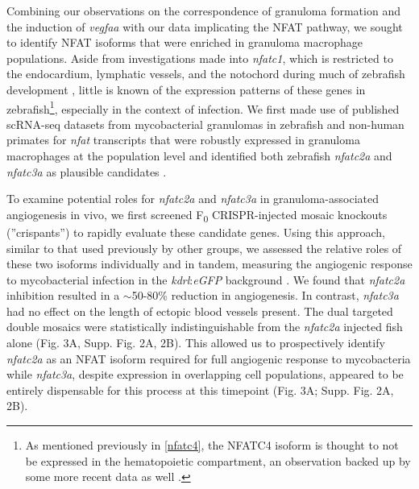 Combining our observations on the correspondence of granuloma formation and the induction of \textit{vegfaa} with our data implicating the NFAT pathway, we sought to identify NFAT isoforms that were enriched in granuloma macrophage populations. Aside from investigations made into \textit{nfatc1}, which is restricted to the endocardium, lymphatic vessels, and the notochord during much of zebrafish development \citep{Pestel2016, Shin2019, Bagwell2020}, little is known of the expression patterns of these genes in zebrafish\footnote{As mentioned previously in \autoref{nfatc4}, the NFATC4 isoform is thought to not be expressed in the hematopoietic compartment, an observation backed up by some more recent data as well \citep{Peuker2022}.}, especially in the context of infection. We first made use of published scRNA-seq datasets from mycobacterial granulomas in zebrafish and non-human primates for \textit{nfat} transcripts that were robustly expressed in granuloma macrophages at the population level and identified both zebrafish \textit{nfatc2a} and \textit{nfatc3a} as plausible candidates \citep{Cronan2021, Gideon2022}.

To examine potential roles for \textit{nfatc2a} and \textit{nfatc3a} in granuloma-associated angiogenesis in vivo, we first screened F\textsubscript{0} CRISPR-injected mosaic knockouts (''crispants'') to rapidly evaluate these candidate genes. Using this approach, similar to that used previously by other groups, we assessed the relative roles of these two isoforms individually and in tandem, measuring the angiogenic response to mycobacterial infection in the \textit{kdrl}:\textit{eGFP} background \citep{Jao2013, Hoshijima2016, Wu2018, Hoshijima2019, Kroll2021}. We found that \textit{nfatc2a} inhibition resulted in a $\sim$50-80\% reduction in angiogenesis. In contrast, \textit{nfatc3a} had no effect on the length of ectopic blood vessels present. The dual targeted double mosaics were statistically indistinguishable from the \textit{nfatc2a} injected fish alone (Fig. 3A, Supp. Fig. 2A, 2B). This allowed us to prospectively identify \textit{nfatc2a} as an NFAT isoform required for full angiogenic response to mycobacteria while \textit{nfatc3a}, despite expression in overlapping cell populations, appeared to be entirely dispensable for this process at this timepoint (Fig. 3A; Supp. Fig. 2A, 2B). 

